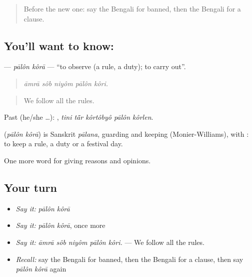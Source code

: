 \begin{quote}
Before the new one: say the Bengali for banned, then the Bengali for a clause.
\end{quote}

\subsection*{You'll want to know:  }
\textbf{ } — \emph{pālôn kôrā} — \textquotedblleft{}to observe (a rule, a duty); to carry out\textquotedblright{}.

\begin{quote}
    
\end{quote}

\begin{quote}
\emph{āmrā sôb niyôm pālôn kôri.}
\end{quote}

\begin{quote}
We follow all the rules.
\end{quote}

Past (he/she …):     , \emph{tini tā̃r kôrtôbyô pālôn kôrlen}.

\begin{cousinweb}
\textbf{ } (\emph{pālôn kôrā}) is Sanskrit \emph{pālana}, guarding and keeping (Monier-Williams), with : to keep a rule, a duty or a festival day.
\end{cousinweb}

\begin{grammarlens}[title={What you've built}]
One more word for giving reasons and opinions.
\end{grammarlens}

\subsection*{Your turn}
\begin{itemize}
\raggedright
  \item \emph{Say it:} \emph{pālôn kôrā}
  \item \emph{Say it:} \emph{pālôn kôrā}, once more
  \item \emph{Say it:} \emph{āmrā sôb niyôm pālôn kôri.} — We follow all the rules.
  \item \emph{Recall:} say the Bengali for banned, then the Bengali for a clause, then say \emph{pālôn kôrā} again
\end{itemize}

